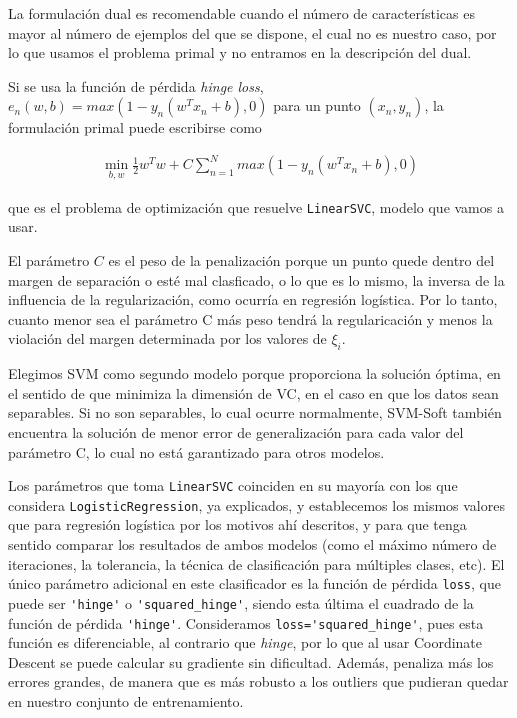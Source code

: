 \documentclass[a4]{article}
\begin{document}
La formulación dual es recomendable cuando el número de características es mayor al número de ejemplos del que se dispone, el cual no es nuestro caso, por lo que usamos el problema primal y no entramos en la descripción del dual. 

Si se usa la función de pérdida \textit{hinge loss}, $e_n(w,b)=max(1-y_n(w^Tx_n+b),0)$ para un punto $(x_n,y_n)$, la formulación primal puede escribirse como

\begin{align*}
\min\limits_{b,w}\frac{1}{2}w^Tw + C \sum_{n=1}^{N}max(1-y_n(w^Tx_n+b),0)
\end{align*}

que es el problema de optimización que resuelve \lstinline|LinearSVC|, modelo que vamos a usar. 

El parámetro $C$ es el peso de la penalización porque un punto quede dentro del margen de separación o esté mal clasficado, o lo que es lo mismo, la inversa de la influencia de la regularización, como ocurría en regresión logística. Por lo tanto, cuanto menor sea el parámetro C más peso tendrá la regularicación y menos la violación del margen determinada por los valores de $\xi_i$.  

Elegimos SVM como segundo modelo porque proporciona la solución óptima, en el sentido de que minimiza la dimensión de VC, en el caso en que los datos sean separables. Si no son separables, lo cual ocurre normalmente, SVM-Soft también encuentra la solución de menor error de generalización para cada valor del parámetro C, lo cual no está garantizado para otros modelos. 

Los parámetros que toma \lstinline|LinearSVC| coinciden en su mayoría con los que considera \lstinline|LogisticRegression|, ya explicados, y establecemos los mismos valores que para regresión logística por los motivos ahí descritos, y para que tenga sentido comparar los resultados de ambos modelos (como el máximo número de iteraciones, la tolerancia, la técnica de clasificación para múltiples clases, etc). 
El único parámetro adicional en este clasificador es la función de pérdida \lstinline|loss|, que puede ser \lstinline|'hinge'| o \lstinline|'squared_hinge'|, siendo esta última el cuadrado de la función de pérdida \lstinline|'hinge'|. Consideramos \lstinline|loss='squared_hinge'|, pues esta función es diferenciable, al contrario que \textit{hinge}, por lo que al usar Coordinate Descent se puede calcular su gradiente sin dificultad. Además, penaliza más los errores grandes, de manera que es más robusto a los outliers que pudieran quedar en nuestro conjunto de entrenamiento.  
\end{document}
